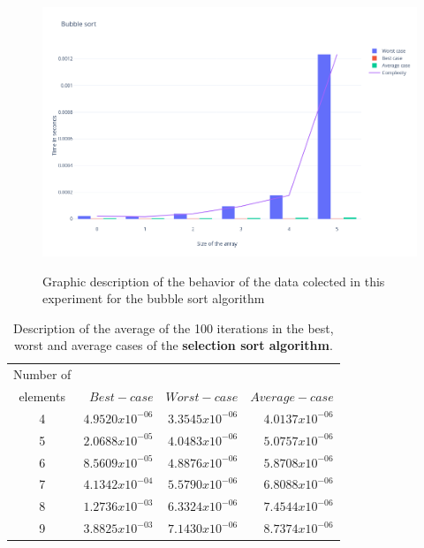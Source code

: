 \documentclass{article}
\begin{document}
 
\begin{figure}[htp]
	\centering
	\caption{Graphic description of the behavior of the data colected in this experiment for the bubble sort algorithm}
	\includegraphics[width=\linewidth]{Bubblesort.png}
	\label{ima1}
\end{figure}

    \begin{table}[h!]
\centering
 \caption{Description of the average of the 100 iterations in the best, worst and average cases of the \textbf{selection sort algorithm}. } 
 \label{ta4}
 \begin{tabular} {| c | r | r | r | }
 \hline
Number of 	&		&		&		\\
 elements	&		$	Best-case	$	&	$	Worst-case	$	&	$	Average -case	$	\\
 \hline

4	&	$	4.9520x10^{-06}	$	&	$	3.3545x10^{-06}	$	&	$	4.0137x10^{-06}	$	\\
 \hline
5	&	$	2.0688x10^{-05}	$	&	$	4.0483x10^{-06}	$	&	$	5.0757x10^{-06}	$	\\
 \hline
6	&	$	8.5609x10^{-05}	$	&	$	4.8876x10^{-06}	$	&	$	5.8708x10^{-06}	$	\\
 \hline
7	&	$	4.1342x10^{-04}	$	&	$	5.5790x10^{-06}	$	&	$	6.8088x10^{-06}	$	\\
 \hline
8	&	$	1.2736x10^{-03}	$	&	$	6.3324x10^{-06}	$	&	$	7.4544x10^{-06}	$	\\
 \hline
9	&	$	3.8825x10^{-03}	$	&	$	7.1430x10^{-06}	$	&	$	8.7374x10^{-06}	$	\\
\hline
 \end{tabular}
 \end{table}
\end{document}
